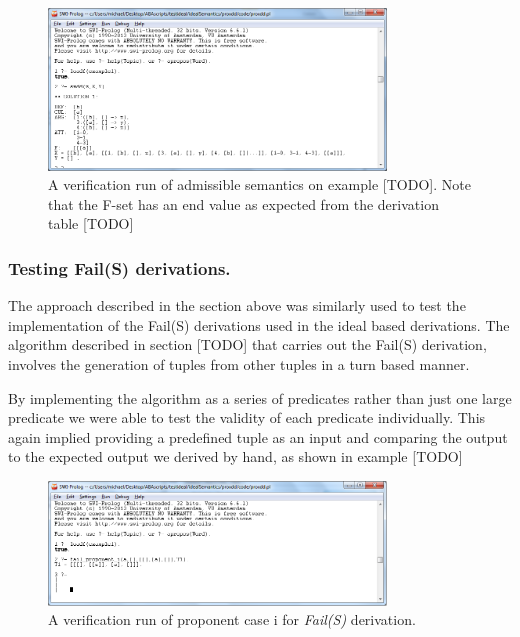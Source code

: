 \begin{figure}[h]
    \centering
    \includegraphics[width=0.8\textwidth]{swiFset.png}
    \caption{A verification run of admissible semantics on example [TODO]. Note that the F-set has an end value as expected from the derivation table [TODO]}
    \label{fig:arg_swi_ideal}
\end{figure}

\subsubsection{Testing Fail(S) derivations.}
The approach described in the section above was similarly used to test the implementation of the Fail(S) derivations used in the ideal based derivations. The algorithm described in section [TODO] that carries out the Fail(S) derivation, involves the generation of tuples from other tuples in a turn based manner. 

By implementing the algorithm as a series of predicates rather than just one large predicate we were able to test the validity of each predicate individually. This again implied providing a predefined tuple as an input and comparing the output to the expected output we derived by hand, as shown in example [TODO]

\begin{figure}[h]
    \centering
    \includegraphics[width=0.8\textwidth]{swiFailStep.png}
    \caption{A verification run of proponent case i for \emph{Fail(S)} derivation.}
    \label{fig:arg_swi_fail_step}
\end{figure}

